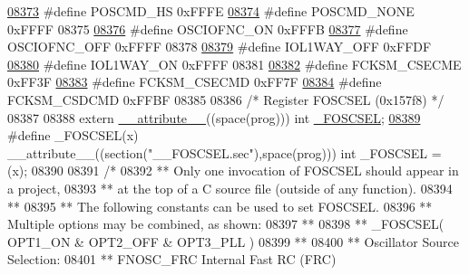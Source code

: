 \begin{DoxyCode}
{{{{\hypertarget{a00009_source_l08373}{}\hyperlink{a00009_a24434b72a63fcd22bddc716d96953657}{08373} \textcolor{preprocessor}{#define POSCMD\_HS            0xFFFE}
\hypertarget{a00009_source_l08374}{}\hyperlink{a00009_aac901a76d1e044e1679bbd47e7fff186}{08374} \textcolor{preprocessor}{#define POSCMD\_NONE          0xFFFF}
08375 
\hypertarget{a00009_source_l08376}{}\hyperlink{a00009_ae1dc2c395c9a8f56047b4cc596c24914}{08376} \textcolor{preprocessor}{#define OSCIOFNC\_ON          0xFFFB}
\hypertarget{a00009_source_l08377}{}\hyperlink{a00009_a19af11fd10f863d184cbeaf76a319bbc}{08377} \textcolor{preprocessor}{#define OSCIOFNC\_OFF         0xFFFF}
08378 
\hypertarget{a00009_source_l08379}{}\hyperlink{a00009_ac7d3bd59e6163fbdb321c70d26259957}{08379} \textcolor{preprocessor}{#define IOL1WAY\_OFF          0xFFDF}
\hypertarget{a00009_source_l08380}{}\hyperlink{a00009_a18076e33c5b0e6fd8402b36cdef4035f}{08380} \textcolor{preprocessor}{#define IOL1WAY\_ON           0xFFFF}
08381 
\hypertarget{a00009_source_l08382}{}\hyperlink{a00009_a3b3c8eac4d4421e6b1c4ee083dc4fa72}{08382} \textcolor{preprocessor}{#define FCKSM\_CSECME         0xFF3F}
\hypertarget{a00009_source_l08383}{}\hyperlink{a00009_a001fd37194796130d0a3b27a0dc7979b}{08383} \textcolor{preprocessor}{#define FCKSM\_CSECMD         0xFF7F}
\hypertarget{a00009_source_l08384}{}\hyperlink{a00009_a11f6a0b3b14aed1bef93ec8af79b271e}{08384} \textcolor{preprocessor}{#define FCKSM\_CSDCMD         0xFFBF}
08385 
08386 \textcolor{comment}{/* Register FOSCSEL (0x157f8)                               */}
08387 
08388 \textcolor{keyword}{extern} \hyperlink{a00009_a493c46f03454991ccc5aa7a6e1dfb2a7}{\_\_attribute\_\_}((space(prog))) int \hyperlink{a00009_a476dc13664037647093609ee08fab219}{\_FOSCSEL};
\hypertarget{a00009_source_l08389}{}\hyperlink{a00009_a476dc13664037647093609ee08fab219}{08389} \textcolor{preprocessor}{#define \_FOSCSEL(x) \_\_attribute\_\_((section("\_\_FOSCSEL.sec"),space(prog))) int \_FOSCSEL = (x);}
08390 
08391 \textcolor{comment}{/*}
08392 \textcolor{comment}{** Only one invocation of FOSCSEL should appear in a project,}
08393 \textcolor{comment}{** at the top of a C source file (outside of any function).}
08394 \textcolor{comment}{**}
08395 \textcolor{comment}{** The following constants can be used to set FOSCSEL.}
08396 \textcolor{comment}{** Multiple options may be combined, as shown:}
08397 \textcolor{comment}{**}
08398 \textcolor{comment}{** \_FOSCSEL( OPT1\_ON & OPT2\_OFF & OPT3\_PLL )}
08399 \textcolor{comment}{**}
08400 \textcolor{comment}{**   Oscillator Source Selection:}
08401 \textcolor{comment}{**     FNOSC\_FRC            Internal Fast RC (FRC)}
}}}}
\end{DoxyCode}
